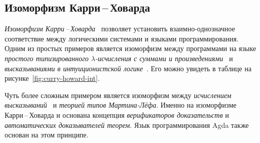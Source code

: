 %
%


\subsection{Изоморфизм Карри\,–\,Ховарда}

\emph{Изоморфизм Карри\,--\,Ховарда}~\cite{curryhoward} позволяет
установить взаимно-однозначное соответствие между логическими
системами и языками программирования. Одним из простых примеров
является изоморфизм между программами на языке \emph{простого
  типизированного $\lambda$-исчисления с суммами и
  произведениями}~\cite{curryhoward} и \emph{высказываниями в
  интуиционистской логике}~\cite{curryhoward}. Его можно увидеть в
таблице на рисунке~\ref{fig:curry-howard-int}. 

Чуть более сложным примером является изоморфизм между
\emph{исчислением высказываний}~\cite{шень2,curryhoward} и
\emph{теорией типов Мартина-Лёфа}. Именно на изоморфизме
Карри\,--\,Ховарда и основана концепция \emph{верификаторов
  доказательств} и \emph{автоматических доказывателей теорем}. Язык
программирования Agda также основан на этом принципе.


